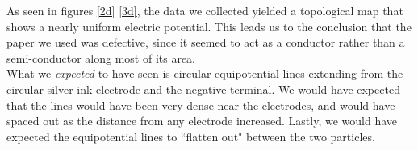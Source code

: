 \documentclass[oneside,12pt]{amsart}
\begin{document}
		\indent As seen in figures \ref{2d} \ref{3d}, the data we collected yielded a topological map that shows a nearly uniform electric potential. This leads us to the conclusion that the paper we used was defective, since it seemed to act as a conductor rather than a semi-conductor along most of its area.\\
		
		\indent What we \textit{expected} to have seen is circular equipotential lines extending from the circular silver ink electrode and the negative terminal. We would have expected that the lines would have been very dense near the electrodes, and would have spaced out as the distance from any electrode increased. Lastly, we would have expected the equipotential lines to ``flatten out" between the two particles.\\
		
\end{document}

